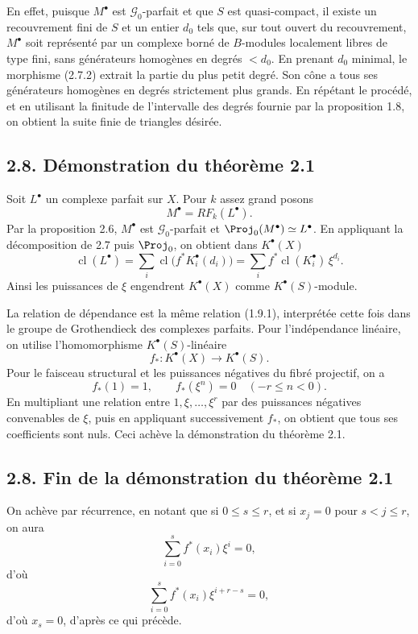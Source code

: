 \documentclass[11pt]{article}
\newcommand{\cl}{\operatorname{cl}}
\begin{document}
En effet, puisque \(M^\bullet\) est \(\mathcal G_0\)-parfait et que \(S\) est quasi-compact, il existe un recouvrement fini de \(S\) et un entier \(d_0\) tels que, sur tout ouvert du recouvrement, \(M^\bullet\) soit représenté par un complexe borné de \(B\)-modules localement libres de type fini, sans générateurs homogènes en degrés \(<d_0\). En prenant \(d_0\) minimal, le morphisme (2.7.2) extrait la partie du plus petit degré. Son cône a tous ses générateurs homogènes en degrés strictement plus grands. En répétant le procédé, et en utilisant la finitude de l'intervalle des degrés fournie par la proposition 1.8, on obtient la suite finie de triangles désirée.

\subsection*{2.8. Démonstration du théorème 2.1}
Soit \(L^\bullet\) un complexe parfait sur \(X\). Pour \(k\) assez grand posons
\[
  M^\bullet=RF_k(L^\bullet).
\]
Par la proposition 2.6, \(M^\bullet\) est \(\mathcal G_0\)-parfait et \(\Proj_0(M^\bullet)\simeq L^\bullet\). En appliquant la décomposition de 2.7 puis \(\Proj_0\), on obtient dans \(K^\bullet(X)\)
\[
  \cl(L^\bullet)
  =
  \sum_i\cl\bigl(f^*K_i^\bullet(d_i)\bigr)
  =
  \sum_i f^*\cl(K_i^\bullet)\,\xi^{d_i}.
\]
Ainsi les puissances de \(\xi\) engendrent \(K^\bullet(X)\) comme \(K^\bullet(S)\)-module.

La relation de dépendance est la même relation (1.9.1), interprétée cette fois dans le groupe de Grothendieck des complexes parfaits. Pour l'indépendance linéaire, on utilise l'homomorphisme \(K^\bullet(S)\)-linéaire
\[
  f_*:K^\bullet(X)\longrightarrow K^\bullet(S).
\]
Pour le faisceau structural et les puissances négatives du fibré projectif, on a
\[
  f_*(1)=1,\qquad f_*(\xi^n)=0\quad(-r\leq n<0).
\]
En multipliant une relation entre \(1,\xi,\ldots,\xi^r\) par des puissances négatives convenables de \(\xi\), puis en appliquant successivement \(f_*\), on obtient que tous ses coefficients sont nuls. Ceci achève la démonstration du théorème 2.1.



\subsection*{2.8. Fin de la démonstration du théorème 2.1}
On achève par récurrence, en notant que si \(0\leq s\leq r\), et si \(x_j=0\) pour \(s<j\leq r\), on aura
\[
  \sum_{i=0}^{s} f^*(x_i)\xi^i=0,
\]
d'où
\[
  \sum_{i=0}^{s} f^*(x_i)\xi^{i+r-s}=0,
\]
d'où \(x_s=0\), d'après ce qui précède.
\end{document}
